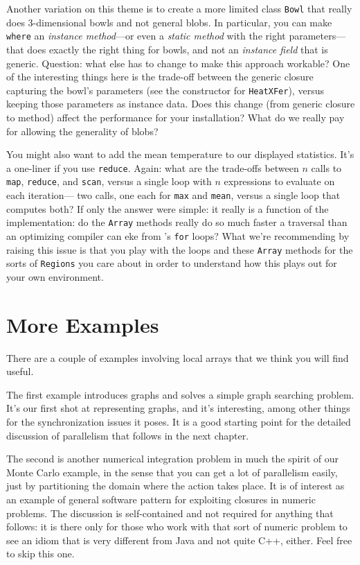 Another variation on this theme is to create a more limited class {\tt Bowl}
that really does 3-dimensional bowls and not general blobs.  In particular, you
can make {\tt where} an {\em instance method}---or even a {\em static method}
with the right parameters---that does exactly the right thing for bowls, and
not an {\em instance field} that is generic.  Question: what else has to
change to make this approach workable? One of the
interesting things here is the trade-off between the generic closure
capturing the bowl's parameters (see the constructor for {\tt HeatXFer}),
versus keeping those parameters as instance data.  Does this
change (from generic closure to method) affect the performance for your
installation? What do we really pay for allowing the generality of blobs?

You might also want to add the mean temperature to our displayed statistics. 
It's a one-liner if you use {\tt reduce}.  Again: what are the trade-offs
between $n$ calls to {\tt map}, {\tt reduce}, and {\tt scan}, versus a
single loop with $n$ expressions to evaluate on each iteration---\eg{} two
calls, one each for {\tt max} and {\tt mean}, versus a single loop that
computes both?   If only the answer were simple: it really is a function
of the implementation: do the {\tt Array} methods really do so much
faster a traversal than an optimizing compiler can eke from 
\Xten's {\tt for} loops?  What we're recommending by raising this
issue is that you
play with the loops and these {\tt Array} methods for the sorts of {\tt Regions} you
care about in order to understand how this plays out for your own environment.
\section{More Examples}
There are a couple of examples involving local arrays that we think you will
find useful.  

The first
example introduces graphs and solves a simple graph searching problem.  It's our
first shot at representing graphs, and it's interesting, among other things for
the synchronization issues it poses.  It is a good starting point for the
detailed discussion of parallelism that follows in the next chapter.


The second is another numerical integration problem in
much the spirit of our Monte Carlo example, in the sense that you can get
a lot of parallelism easily, just by partitioning the domain where the action takes
place.  It is of interest as an example of general software pattern for exploiting
closures in numeric problems.  The discussion is self-contained and not required
for anything that follows: it is there only for those who work with that sort of
numeric problem to see an \Xten{} idiom that is very different from Java and
not quite C++, either.   Feel free to skip this one.

